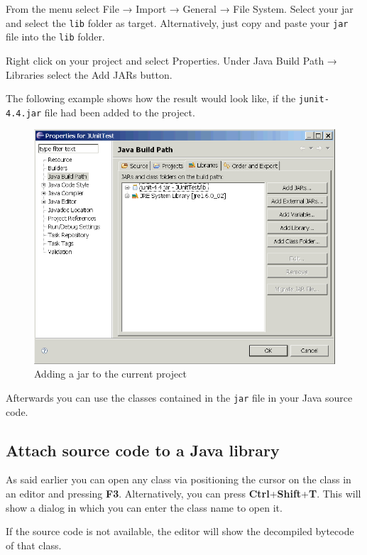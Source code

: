 From the menu select File → Import → General → File System. Select your
jar and select the \texttt{lib} folder as target. Alternatively, just
copy and paste your \texttt{jar} file into the \texttt{lib} folder.

Right click on your project and select Properties. Under Java Build Path
→ Libraries select the Add JARs button.

The following example shows how the result would look like, if the
\texttt{junit-4.4.jar} file had been added to the project.

\begin{figure}[htbp]
\centering
\includegraphics[scale=.5]{images/build-path}
\caption{Adding a jar to the current project}
\end{figure}

Afterwards you can use the classes contained in the \texttt{jar} file in
your Java source code.

\subsection{Attach source code to a Java library}

As said earlier you can open any class via positioning the cursor on the
class in an editor and pressing \textbf{F3}. Alternatively, you can
press \textbf{Ctrl}+\textbf{Shift}+\textbf{T}. This will show a dialog
in which you can enter the class name to open it.

If the source code is not available, the editor will show the decompiled
bytecode of that class.

